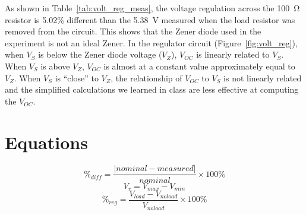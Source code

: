 \documentclass{article}
\begin{document}
As shown in Table~\ref{tab:volt_reg_meas}, the voltage regulation across the \SI{100}{\ohm} resistor is 5.02\% different than the \SI{5.38}{V} measured when the load resistor was removed from the circuit. This shows that the Zener diode used in the experiment is not an ideal Zener. In the regulator circuit (Figure~\ref{fig:volt_reg}), when $V_S$ is below the Zener diode voltage ($V_Z$), $V_{OC}$ is linearly related to $V_S$. When $V_S$ is above $V_Z$, $V_{OC}$ is almost at a constant value approximately equal to $V_Z$. When $V_S$ is “close” to $V_Z$, the relationship of $V_{OC}$ to $V_S$ is not linearly related and the simplified calculations we learned in class are less effective at computing the $V_{OC}$.

%





\section{Equations}
\label{sec:equations}

%
\begin{equation}
  \label{eq:percent_diff}
  \%_{diff} = \frac{|nominal - measured|}{nominal}\times 100\%
\end{equation}
%
\begin{equation}
  \label{eq:ripple}
  V_r = V_{max} - V_{min}
\end{equation}
%
\begin{equation}
  \label{eq:volt_reg}
  \%_{reg} = \frac{V_{load} - V_{no load}}{V_{no load}}\times 100\%
\end{equation}
\end{document}
